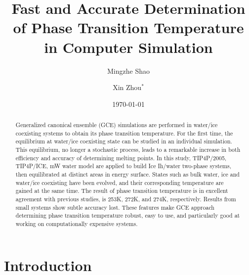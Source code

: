 \documentclass[aps,prl,twocolumn,superscriptaddress]{revtex4-1}
\begin{document}
\title{Fast and Accurate Determination of Phase Transition Temperature in Computer Simulation}

\author{Mingzhe Shao}

\author{Xin Zhou$^{*}$}

\date{\today}
 

\begin{abstract}  
Generalized canonical ensemble (GCE) simulations are performed in water/ice coexisting systems to obtain its phase transition temperature. For the first time, the equilibrium at water/ice coexisting state can be studied in an individual simulation. This equilibrium, no longer a stochastic process, leads to a remarkable increase in both efficiency and accuracy of determining melting points. In this study, TIP4P/2005, TIP4P/ICE, mW water model are applied to build Ice Ih/water two-phase systems, then equilibrated at distinct areas in energy surface. States such as bulk water, ice and water/ice coexisting have been evolved, and their corresponding temperature are gained at the same time. The result of phase transition temperature is in excellent agreement with previous studies, is 253K, 272K, and 274K, respectively. Results from small systems show subtle accuracy lost.  These features make GCE approach determining phase transition temperature robust, easy to use, and particularly good at working on computationally expensive systems.
\end{abstract}

\pacs{ } 

\maketitle{}
\section{Introduction}
\end{document}
